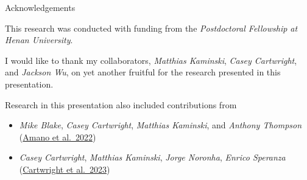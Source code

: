 \documentclass[xcolor=dvipsnames]{beamer}
\begin{document}
\begin{frame}{Acknowledgements}

  This research was conducted with funding from the \emph{Postdoctoral
  Fellowship at Henan University}.

  \vfill 

  I would like to thank my collaborators, \emph{Matthias Kaminski},
  \emph{Casey Cartwright}, and \emph{Jackson Wu}, on yet another fruitful
  for the research presented in this presentation.

  \vfill 

  Research in this presentation also included contributions from

  \begin{itemize}
    \item
      \emph{Mike Blake}, \emph{Casey Cartwright}, \emph{Matthias Kaminski},
      and \emph{Anthony Thompson}\\
      (\href{https://inspirehep.net/literature/2174613}{Amano et al.~2022})
    \item
      \emph{Casey Cartwright}, \emph{Matthias Kaminski}, \emph{Jorge
      Noronha}, \emph{Enrico Speranza}\\
      (\href{https://inspirehep.net/literature/1994753}{Cartwright et al.~2023})
  \end{itemize}
\end{frame}




\end{document}
